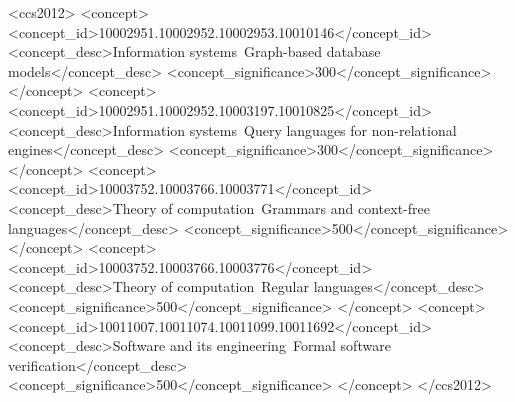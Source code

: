 \documentclass[sigplan,10pt,review]{acmart}\settopmatter{printfolios=true, printccs=false, printacmref=false}
\begin{document}
\begin{CCSXML}
<ccs2012>
<concept>
<concept_id>10002951.10002952.10002953.10010146</concept_id>
<concept_desc>Information systems~Graph-based database models</concept_desc>
<concept_significance>300</concept_significance>
</concept>
<concept>
<concept_id>10002951.10002952.10003197.10010825</concept_id>
<concept_desc>Information systems~Query languages for non-relational engines</concept_desc>
<concept_significance>300</concept_significance>
</concept>
<concept>
<concept_id>10003752.10003766.10003771</concept_id>
<concept_desc>Theory of computation~Grammars and context-free languages</concept_desc>
<concept_significance>500</concept_significance>
</concept>
<concept>
<concept_id>10003752.10003766.10003776</concept_id>
<concept_desc>Theory of computation~Regular languages</concept_desc>
<concept_significance>500</concept_significance>
</concept>
<concept>
<concept_id>10011007.10011074.10011099.10011692</concept_id>
<concept_desc>Software and its engineering~Formal software verification</concept_desc>
<concept_significance>500</concept_significance>
</concept>
</ccs2012>
\end{CCSXML}





\maketitle
\end{document}
